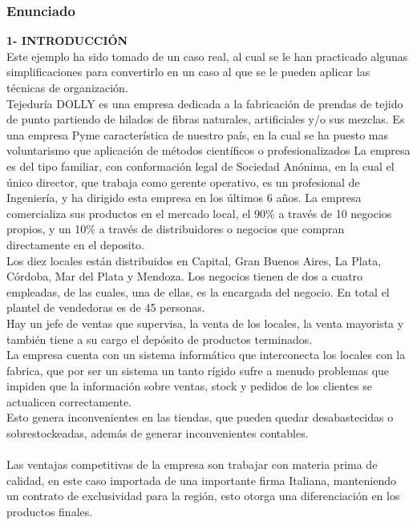 \documentclass[a4paper,10pt,titlepage]{article}
\begin{document}
\subsubsection{Enunciado}
\textbf{1- INTRODUCCI\'ON}\\
Este ejemplo ha sido tomado de un caso real, al cual se le han practicado algunas
simplificaciones para convertirlo en un caso al que se le pueden aplicar las t\'ecnicas
de organizaci\'on.\\
Tejedur\'ia DOLLY es una empresa dedicada a la fabricaci\'on de prendas de tejido
de punto partiendo de hilados de fibras naturales, artificiales y/o sus mezclas.
Es una empresa Pyme caracter\'istica de nuestro pa\'is, en la cual se ha puesto mas
voluntarismo que aplicaci\'on de m\'etodos cient\'ificos o profesionalizados
La empresa es del tipo familiar, con conformaci\'on legal de Sociedad An\'onima, en
la cual el \'unico director, que trabaja como gerente operativo, es un profesional de
Ingenier\'ia, y ha dirigido esta empresa en los \'ultimos 6 años.
La empresa comercializa sus productos en el mercado local, el 90\% a trav\'es de 10
negocios propios, y un 10\% a trav\'es de distribuidores o negocios que compran
directamente en el deposito.\\
Los diez locales est\'an distribuidos en Capital, Gran Buenos Aires, La Plata,
C\'ordoba, Mar del Plata y Mendoza. Los negocios tienen de dos a cuatro
empleadas, de las cuales, una de ellas, es la encargada del negocio. En total el
plantel de vendedoras es de 45 personas.\\
Hay un jefe de ventas que supervisa, la venta de los locales, la venta mayorista y
tambi\'en tiene a su cargo el dep\'osito de productos terminados.\\
La empresa cuenta con un sistema inform\'atico que interconecta los locales con la
fabrica, que por ser un sistema un tanto r\'igido sufre a menudo problemas que
impiden que la informaci\'on sobre ventas, stock y pedidos de los clientes se
actualicen correctamente.\\
Esto genera inconvenientes en las tiendas, que pueden quedar desabastecidas o
sobrestockeadas, adem\'as de generar inconvenientes contables.\\ \\
Las ventajas competitivas de la empresa son trabajar con materia prima de calidad,
en este caso importada de una importante firma Italiana, manteniendo un contrato
de exclusividad para la regi\'on, esto otorga una diferenciaci\'on en los productos
finales.\\
\end{document}
